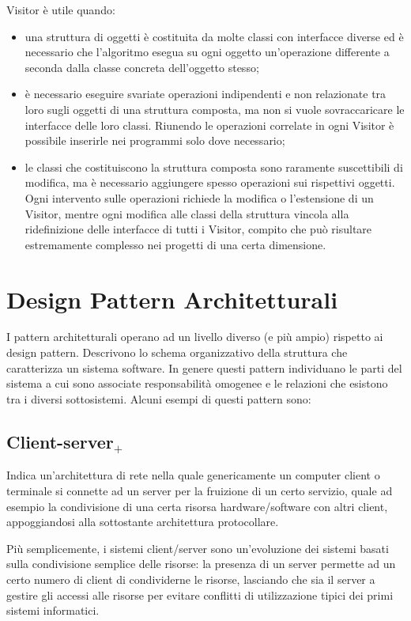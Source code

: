 Visitor è utile quando:
\begin{itemize}
	\item una struttura di oggetti è costituita da molte classi con interfacce diverse ed è necessario che l'algoritmo esegua su ogni oggetto un'operazione differente a seconda dalla classe concreta dell'oggetto stesso;
	\item è necessario eseguire svariate operazioni indipendenti e non relazionate tra loro sugli oggetti di una struttura composta, ma non si vuole sovraccaricare le interfacce delle loro classi. Riunendo le operazioni correlate in ogni Visitor è possibile inserirle nei programmi solo dove necessario;
	\item le classi che costituiscono la struttura composta sono raramente suscettibili di modifica, ma è necessario aggiungere spesso operazioni sui rispettivi oggetti. Ogni intervento sulle operazioni richiede la modifica o l'estensione di un Visitor, mentre ogni modifica alle classi della struttura vincola alla ridefinizione delle interfacce di tutti i Visitor, compito che può risultare estremamente complesso nei progetti di una certa dimensione.
\end{itemize}

\section{Design Pattern Architetturali}
I pattern architetturali operano ad un livello diverso (e più ampio) rispetto ai design pattern. Descrivono lo schema organizzativo della struttura che caratterizza un sistema software. In genere questi pattern individuano le parti del sistema a cui sono associate responsabilità omogenee e le relazioni che esistono tra i diversi sottosistemi.
Alcuni esempi di questi pattern sono:

\subsection{Client-server$_+$}
Indica un'architettura di rete nella quale genericamente un computer client o terminale si connette ad un server per la fruizione di un certo servizio, quale ad esempio la condivisione di una certa risorsa hardware/software con altri client, appoggiandosi alla sottostante architettura protocollare.

Più semplicemente, i sistemi client/server sono un'evoluzione dei sistemi basati sulla condivisione semplice delle risorse: la presenza di un server permette ad un certo numero di client di condividerne le risorse, lasciando che sia il server a gestire gli accessi alle risorse per evitare conflitti di utilizzazione tipici dei primi sistemi informatici.

